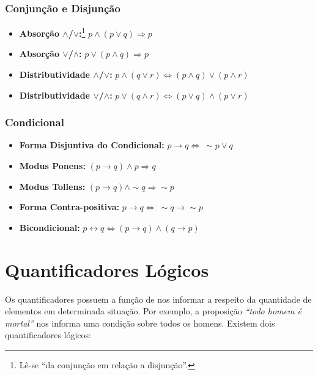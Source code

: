 \subsubsection{Conjunção e Disjunção}
\begin{itemize}
	\item \textbf{Absorção $\wedge$/$\vee$:}\footnote{Lê-se ``da conjunção em relação a disjunção''.} $p \wedge \left( p \vee q \right) \Rightarrow p$
	\item \textbf{Absorção $\mathbf{\vee}$/$\mathbf{\wedge}$:} $p \vee \left( p \wedge q \right) \Rightarrow p$
	\item \textbf{Distributividade $\wedge$/$\vee$:} $p \wedge \left( q \vee r \right) \Leftrightarrow \left( p \wedge q \right) \vee \left(p \wedge r \right)$
	\item \textbf{Distributividade $\mathbf{\vee}$/$\mathbf{\wedge}$:} $p \vee \left( q \wedge r \right) \Leftrightarrow \left(p \vee q \right) \wedge \left(p \vee r \right)$
\end{itemize}

\subsubsection{Condicional}
\begin{itemize}
	\item \textbf{Forma Disjuntiva do Condicional:} $p \rightarrow q \Leftrightarrow \: \sim p \vee q$
	\item \textbf{Modus Ponens:} $\left(p \rightarrow q \right) \wedge p \Rightarrow q$
	\item \textbf{Modus Tollens:} $\left(p \rightarrow q \right) \wedge \sim q \Rightarrow \sim p$
	\item \textbf{Forma Contra-positiva:} $p \rightarrow q \Leftrightarrow \: \sim q \rightarrow \sim p$
	\item \textbf{Bicondicional:} $p \leftrightarrow q \Leftrightarrow \left(p \rightarrow q \right) \wedge \left( q \rightarrow p \right)$
\end{itemize}

\section{Quantificadores Lógicos}
Os quantificadores possuem a função de nos informar a respeito da quantidade de elementos em determinada situação. Por exemplo, a proposição \textit{``todo homem é mortal''} nos informa uma condição sobre todos os homens. Existem dois quantificadores lógicos:

